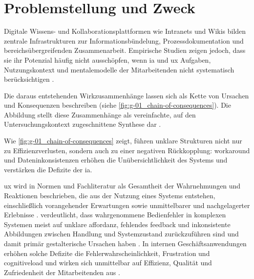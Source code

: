 \section{Problemstellung und Zweck}
\label{sec:01-01_problem-and-context}

Digitale Wissens- und Kollaborationsplattformen wie Intranets und Wikis bilden zentrale Infrastrukturen zur Informationsbündelung, Prozessdokumentation und bereichsübergreifenden Zusammenarbeit. Empirische Studien zeigen jedoch, dass sie ihr Potenzial häufig nicht ausschöpfen, wenn \Gls{ia} und \Gls{ux} Aufgaben, Nutzungskontext und \gls{mentalemodelle} der Mitarbeitenden nicht systematisch berücksichtigen \cite{303:Rosenfeld2015,500:ISO9241-210}.

Die daraus entstehenden Wirkzusammenhänge lassen sich als Kette von Ursachen und Konsequenzen beschreiben (siehe \autoref{fig:g-01_chain-of-consequences}). Die Abbildung stellt diese Zusammenhänge als vereinfachte, auf den Untersuchungskontext zugeschnittene Synthese dar \cite{300:FraunhoferIESE2018,301:Infragistics2015}.


Wie \autoref{fig:g-01_chain-of-consequences} zeigt, führen unklare Strukturen nicht nur zu Effizienzverlusten, sondern auch zu einer negativen Rückkopplung: \Gls{workaround} und Dateninkonsistenzen erhöhen die Unübersichtlichkeit des Systems und verstärken die Defizite der \Gls{ia}.

\Gls{ux} wird in Normen und Fachliteratur als Gesamtheit der Wahrnehmungen und Reaktionen beschrieben, die aus der Nutzung eines Systems entstehen, einschließlich vorangehender Erwartungen sowie unmittelbarer und nachgelagerter Erlebnisse \cite{500:ISO9241-210}. \citeauthor{400:Norman2013} verdeutlicht, dass wahrgenommene Bedienfehler in komplexen Systemen meist auf unklare \Gls{affordanz}, fehlendes \Gls{feedback} und inkonsistente Abbildungen zwischen Handlung und Systemzustand zurückzuführen sind und damit primär gestalterische Ursachen haben \cite{400:Norman2013}. In internen Geschäftsanwendungen erhöhen solche Defizite die Fehlerwahrscheinlichkeit, Frustration und \gls{cognitiveload} und wirken sich unmittelbar auf Effizienz, Qualität und Zufriedenheit der Mitarbeitenden aus \cite{300:FraunhoferIESE2018,400:Norman2013}.

